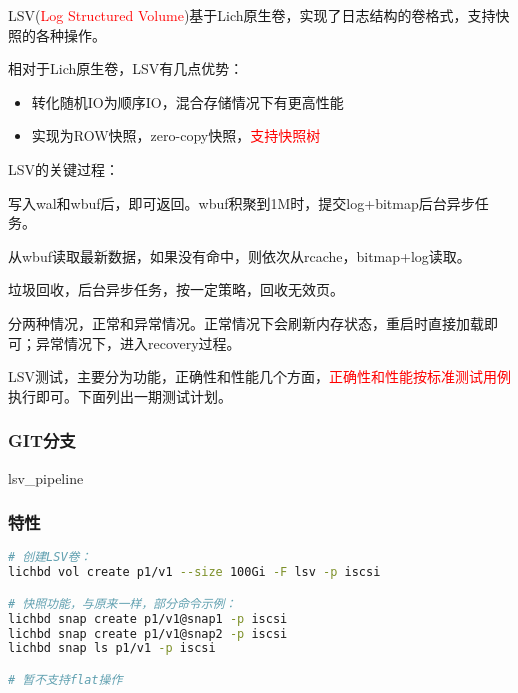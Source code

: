 \documentclass[UTF8]{ctexart}
\begin{document}
LSV(\textcolor{red}{Log Structured Volume})基于Lich原生卷，实现了日志结构的卷格式，支持快照的各种操作。

相对于Lich原生卷，LSV有几点优势：
\begin{tcolorbox}
    \begin{itemize}
        \item 转化随机IO为顺序IO，混合存储情况下有更高性能
        \item 实现为ROW快照，zero-copy快照，\textcolor{red}{支持快照树}
    \end{itemize}
\end{tcolorbox}

LSV的关键过程：
\begin{tcolorbox}
    \begin{description}[style=nextline]
        \item [写] 写入wal和wbuf后，即可返回。wbuf积聚到1M时，提交log+bitmap后台异步任务。
        \item [读] 从wbuf读取最新数据，如果没有命中，则依次从rcache，bitmap+log读取。
        \item [GC] 垃圾回收，后台异步任务，按一定策略，回收无效页。
        \item [重启] 分两种情况，正常和异常情况。正常情况下会刷新内存状态，重启时直接加载即可；异常情况下，进入recovery过程。
    \end{description}
\end{tcolorbox}


LSV测试，主要分为功能，正确性和性能几个方面，\textcolor{red}{正确性和性能按标准测试用例}执行即可。下面列出一期测试计划。

\subsubsection{GIT分支}

lsv\_pipeline

\subsubsection{特性}

\begin{lstlisting}[language=bash,frame=single]
# 创建LSV卷：
lichbd vol create p1/v1 --size 100Gi -F lsv -p iscsi

# 快照功能，与原来一样，部分命令示例：
lichbd snap create p1/v1@snap1 -p iscsi
lichbd snap create p1/v1@snap2 -p iscsi
lichbd snap ls p1/v1 -p iscsi

# 暂不支持flat操作

\end{lstlisting}
\end{document}
